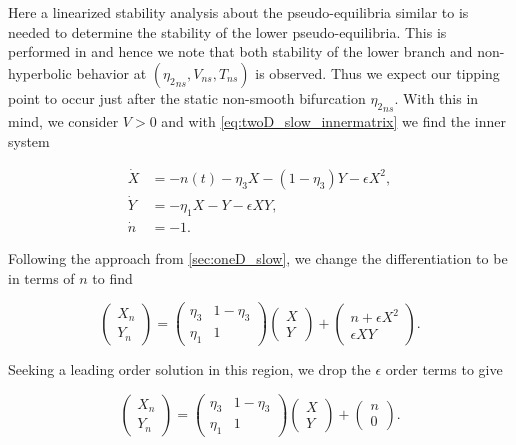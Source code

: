 Here a linearized stability analysis about the pseudo-equilibria similar to \cite{seydel2009practical} is needed to determine the stability of the lower pseudo-equilibria. This is performed in \cite{dijkstra2013nonlinear} and hence we note that both stability of the lower branch and non-hyperbolic behavior at $({\eta_2}_{ns},V_{ns},T_{ns})$ is observed. Thus we expect our tipping point to occur just after the static non-smooth bifurcation ${\eta_2}_{ns}$. With this in mind, we consider $V>0$ and with \eqref{eq:twoD_slow_innermatrix} we find the inner system

\begin{equation}\label{eq:twoD_slow_positiveinner}
 \begin{aligned}
  \dot{X} & = -n(t)-\eta_3 X-(1-\eta_3)Y-\epsilon X^2, \\
  \dot{Y} & = -\eta_1 X-Y-\epsilon XY, \\
 \dot{n} & = -1.
 \end{aligned}
\end{equation}

Following the approach from \autoref{sec:oneD_slow}, we change the differentiation to be in terms of $n$ to find

\begin{equation*}
\begin{pmatrix}
X_n\\
Y_n
\end{pmatrix}=
\begin{pmatrix}
\eta_3 & 1-\eta_3 \\ 
\eta_1 & 1
\end{pmatrix}
\begin{pmatrix}
X\\
Y
\end{pmatrix} +
\begin{pmatrix}
n+\epsilon X^2\\
\epsilon XY
\end{pmatrix}.
\end{equation*}

Seeking a leading order solution in this region, we drop the $\epsilon$ order terms to give 

\begin{equation}\label{eq:twoD_slow_uppermatrix}
\begin{pmatrix}
X_n\\
Y_n
\end{pmatrix}=
\begin{pmatrix}
\eta_3 & 1-\eta_3 \\ 
\eta_1 & 1
\end{pmatrix}
\begin{pmatrix}
X\\
Y
\end{pmatrix} +
\begin{pmatrix}
n\\
0
\end{pmatrix}.
\end{equation}

